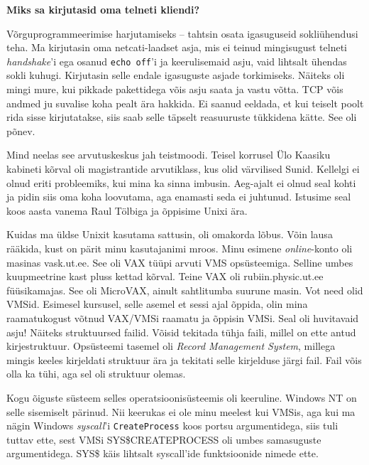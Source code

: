 \textbf{Miks sa kirjutasid oma telneti kliendi?}

Võrguprogrammeerimise harjutamiseks -- tahtsin osata igasuguseid sokliühendusi
teha. Ma kirjutasin oma netcati-laadset asja, mis ei teinud mingisugust telneti
\emph{handshake}'i ega osanud \verb|echo off|'i ja keerulisemaid
asju, vaid lihtsalt ühendas sokli kuhugi. Kirjutasin selle endale
igasuguste asjade torkimiseks. Näiteks oli mingi mure, kui pikkade
pakettidega võis asju saata ja vastu võtta. TCP võis andmed ju suvalise koha
pealt ära hakkida. Ei saanud eeldada, et kui teiselt poolt rida sisse
kirjutatakse, siis saab selle täpselt reasuuruste tükkidena kätte. See oli
põnev.

Mind neelas see arvutuskeskus jah teistmoodi. Teisel korrusel Ülo
Kaasiku kabineti kõrval oli magistrantide arvutiklass,
kus olid värvilised Sunid. Kellelgi
ei olnud eriti probleemiks, kui mina ka sinna imbusin. Aeg-ajalt ei olnud seal
kohti ja pidin siis oma koha loovutama, aga enamasti seda ei
juhtunud. Istusime seal koos aasta vanema Raul Tölbiga ja
õppisime Unixi ära.

Kuidas ma üldse Unixit kasutama sattusin, oli omakorda lõbus. 
Võin lausa rääkida, kust on pärit minu kasutajanimi mroos. Minu
esimene \emph{online}-konto oli masinas vask.ut.ee. See oli
VAX tüüpi arvuti
VMS opsüsteemiga.
Selline umbes kuupmeetrine kast pluss kettad kõrval. Teine VAX oli
rubiin.physic.ut.ee füüsikamajas. See oli
MicroVAX, ainult sahtlitumba suurune masin. Vot need olid \mbox{VMSid}. Esimesel
kursusel, selle asemel et sessi ajal õppida, olin mina raamatukogust võtnud
VAX/VMSi raamatu ja õppisin VMSi. Seal oli huvitavaid asju! Näiteks 
struktuursed failid. Võisid tekitada tühja faili, millel on ette antud
kirjestruktuur. Opsüsteemi tasemel oli \emph{Record Management System}, millega
mingis keeles kirjeldati struktuur ära ja tekitati selle kirjelduse järgi fail.
Fail võis olla ka tühi, aga sel oli struktuur olemas.

Kogu õiguste süsteem selles operatsioonisüsteemis oli keeruline. Windows
NT on selle sisemiselt pärinud. Nii
keerukas ei ole minu meelest kui VMSis, aga kui ma nägin Windows \emph{syscall}'i
\verb|CreateProcess| koos portsu argumentidega, siis tuli tuttav ette, sest
VMSi SYS\$CREATEPROCESS oli umbes samasuguste argumentidega. SYS\$ käis lihtsalt syscall'ide funktsioonide nimede ette.

